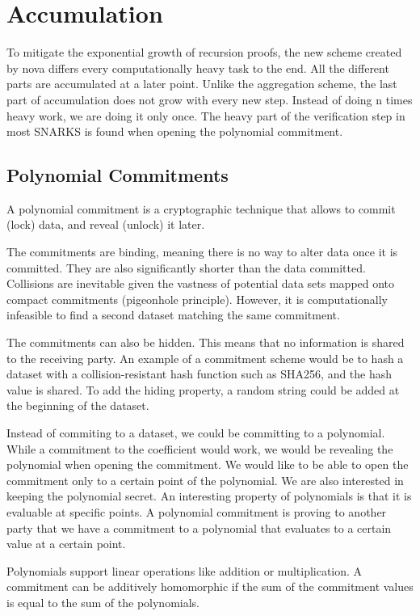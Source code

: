 

\section{Accumulation}
To mitigate the exponential growth of recursion proofs, the new scheme created by nova differs every computationally heavy task to the end.
All the different parts are accumulated at a later point. Unlike the aggregation scheme, the last part of accumulation does not grow with every new step.
Instead of doing n times heavy work, we are doing it only once.
The heavy part of the verification step in most SNARKS is found when opening the polynomial commitment.


\subsection{Polynomial Commitments}


A polynomial commitment is a cryptographic technique that allows to commit (lock) data, and reveal (unlock) it later.


The commitments are binding, meaning there is no way to alter data once it is committed. They are also significantly shorter than
the data committed. Collisions are inevitable given the vastness of potential data sets mapped onto compact commitments (pigeonhole principle).
However, it is computationally infeasible to find a second dataset matching the same commitment.


The commitments can also be hidden. This means that no information is shared to the receiving party.
An example of a commitment scheme would be to hash a dataset with a collision-resistant hash function such as SHA256, and the hash value is shared.
To add the hiding property, a random string could be added at the beginning of the dataset.


Instead of commiting to a dataset, we could be committing to a polynomial. While a commitment to the coefficient would work, we would be revealing the polynomial
when opening the commitment. We would like to be able to open the commitment only to a certain point of the polynomial.
We are also interested in keeping the polynomial secret. An interesting property of polynomials is that it is evaluable at specific points.
A polynomial commitment is proving to another party that we have a commitment to a polynomial that evaluates to a certain value at a certain point.


Polynomials support linear operations like addition or multiplication. A commitment can be additively homomorphic if the sum of the commitment values
is equal to the sum of the polynomials.


